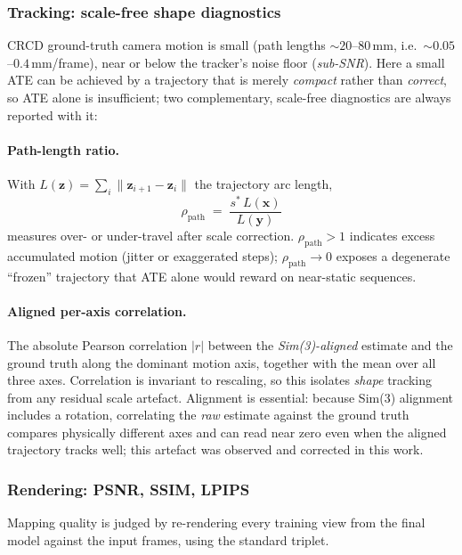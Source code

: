 \documentclass{article}
\begin{document}
\subsubsection{Tracking: scale-free shape diagnostics}
\label{sec:eval_shape}

CRCD ground-truth camera motion is small (path lengths ${\sim}20$--$80$\,mm, i.e.\ ${\sim}0.05$--$0.4$\,mm/frame), near or below the tracker's noise floor (\emph{sub-SNR}). Here a small ATE can be achieved by a trajectory that is merely \emph{compact} rather than \emph{correct}, so ATE alone is insufficient; two complementary, scale-free diagnostics are always reported with it:

\paragraph{Path-length ratio.} With $L(\mathbf{z}) = \sum_i \lVert \mathbf{z}_{i+1} - \mathbf{z}_i \rVert$ the trajectory arc length,
\begin{equation}
\rho_{\mathrm{path}} \;=\; \frac{s^\ast \, L(\mathbf{x})}{L(\mathbf{y})}
\end{equation}
measures over- or under-travel after scale correction. $\rho_{\mathrm{path}} > 1$ indicates excess accumulated motion (jitter or exaggerated steps); $\rho_{\mathrm{path}} \to 0$ exposes a degenerate ``frozen'' trajectory that ATE alone would reward on near-static sequences.

\paragraph{Aligned per-axis correlation.} The absolute Pearson correlation $|r|$ between the \emph{Sim(3)-aligned} estimate and the ground truth along the dominant motion axis, together with the mean over all three axes. Correlation is invariant to rescaling, so this isolates \emph{shape} tracking from any residual scale artefact. Alignment is essential: because Sim(3) alignment includes a rotation, correlating the \emph{raw} estimate against the ground truth compares physically different axes and can read near zero even when the aligned trajectory tracks well; this artefact was observed and corrected in this work.

\subsubsection{Rendering: PSNR, SSIM, LPIPS}
\label{sec:eval_render}

Mapping quality is judged by re-rendering every training view from the final model against the input frames, using the standard triplet.
\end{document}
